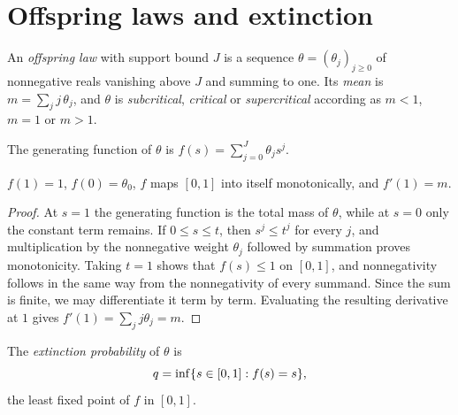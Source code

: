 \chapter{Offspring laws and extinction}
\label{ch:offspring}

\begin{definition}
\label{def:offspring}
\leanok
An \emph{offspring law} with support bound $J$ is a sequence $\theta=(\theta_j)_{j\geq0}$ of
nonnegative reals vanishing above $J$ and summing to one. Its \emph{mean} is
$m=\sum_j j\,\theta_j$, and $\theta$ is \emph{subcritical}, \emph{critical} or
\emph{supercritical} according as $m<1$, $m=1$ or $m>1$.
\end{definition}

\begin{definition}
\label{def:gen}
\leanok
The generating function of $\theta$ is $f(s)=\sum_{j=0}^{J}\theta_j s^j$.
\end{definition}

\begin{lemma}
\label{lem:gen}
\leanok
$f(1)=1$, $f(0)=\theta_0$, $f$ maps $[0,1]$ into itself monotonically, and $f'(1)=m$.
\end{lemma}

\begin{proof}
\leanok
At $s=1$ the generating function is the total mass of $\theta$, while at $s=0$ only the
constant term remains. If $0\leq s\leq t$, then $s^j\leq t^j$ for every $j$, and
multiplication by the nonnegative weight $\theta_j$ followed by summation proves
monotonicity. Taking $t=1$ shows that $f(s)\leq1$ on $[0,1]$, and nonnegativity follows in
the same way from the nonnegativity of every summand. Since the sum is finite, we may
differentiate it term by term. Evaluating the resulting derivative at $1$ gives
$f'(1)=\sum_j j\theta_j=m$.
\end{proof}

\begin{definition}
\label{def:extinction}
\leanok
The \emph{extinction probability} of $\theta$ is
\[
  q=\inf\{s\in[0,1] : f(s)=s\},
\]
the least fixed point of $f$ in $[0,1]$.
\end{definition}

